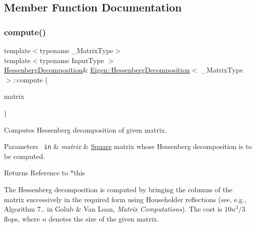 \subsection{Member Function Documentation}
\mbox{\label{class_eigen_1_1_hessenberg_decomposition_a239a6fd42c57aab3c0b048c47fde3004}} 
\subsubsection{\texorpdfstring{compute()}{compute()}}
{\footnotesize\ttfamily template$<$typename \+\_\+\+Matrix\+Type$>$ \\
template$<$typename Input\+Type $>$ \\
\mbox{\hyperlink{class_eigen_1_1_hessenberg_decomposition}{Hessenberg\+Decomposition}}\& \mbox{\hyperlink{class_eigen_1_1_hessenberg_decomposition}{Eigen\+::\+Hessenberg\+Decomposition}}$<$ \+\_\+\+Matrix\+Type $>$\+::compute (\begin{DoxyParamCaption}\item[{const \mbox{\hyperlink{struct_eigen_1_1_eigen_base}{Eigen\+Base}}$<$ Input\+Type $>$ \&}]{matrix }\end{DoxyParamCaption})\hspace{0.3cm}{\ttfamily [inline]}}



Computes Hessenberg decomposition of given matrix. 


\begin{DoxyParams}[1]{Parameters}
\mbox{\texttt{ in}}  & {\em matrix} & \mbox{\hyperlink{class_square}{Square}} matrix whose Hessenberg decomposition is to be computed. \\
\hline
\end{DoxyParams}
\begin{DoxyReturn}{Returns}
Reference to {\ttfamily $\ast$this} 
\end{DoxyReturn}
The Hessenberg decomposition is computed by bringing the columns of the matrix successively in the required form using Householder reflections (see, e.\+g., Algorithm 7.. in Golub \& Van Loan, {\itshape Matrix Computations}). The cost is $ 10n^3/3 $ flops, where $ n $ denotes the size of the given matrix.

